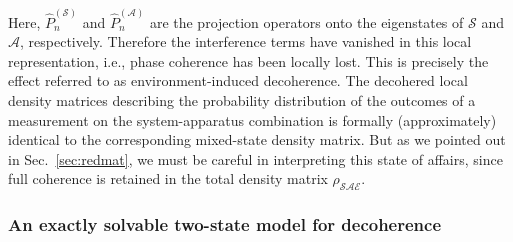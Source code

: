 \documentclass[rmp,aps,amsmath,amsfonts,noshowkeys,noshowpacs,12pt]{revtex4}
\begin{document}
%
Here, $\widehat{P}^{(\mathcal{S})}_n$ and
$\widehat{P}^{(\mathcal{A})}_n$ are the projection operators onto the
eigenstates of $\mathcal{S}$ and $\mathcal{A}$, respectively.
Therefore the interference terms have vanished in this local
representation, i.e., phase coherence has been locally lost. This is
precisely the effect referred to as environment-induced decoherence.
The decohered local density matrices describing the probability
distribution of the outcomes of a measurement on the system-apparatus
combination is formally (approximately) identical to the corresponding
mixed-state density matrix. But as we pointed out in
Sec.~\ref{sec:redmat}, we must be careful in interpreting this state
of affairs, since full coherence is retained in the total density
matrix $\rho_{\mathcal{SAE}}$.


\subsubsection{\label{sec:zurekmodel}An exactly solvable two-state model for decoherence}
\end{document}
